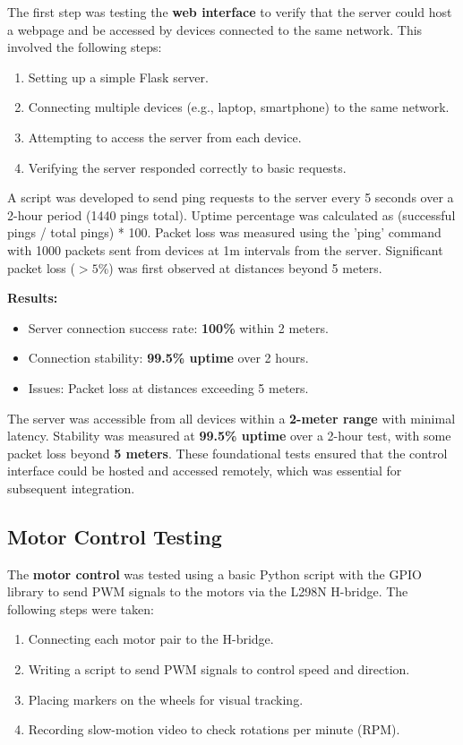 The first step was testing the \textbf{web interface} to verify that the server could host a webpage and be accessed by devices connected to the same network. This involved the following steps:

\begin{enumerate}
	\item Setting up a simple Flask server.
	\item Connecting multiple devices (e.g., laptop, smartphone) to the same network.
	\item Attempting to access the server from each device.
	\item Verifying the server responded correctly to basic requests.
\end{enumerate}

 A script was developed to send ping requests to the server every 5 seconds over a 2-hour period (1440 pings total). Uptime percentage was calculated as (successful pings / total pings) * 100.  Packet loss was measured using the 'ping' command with 1000 packets sent from devices at 1m intervals from the server. Significant packet loss (\(>5\)\%) was first observed at distances beyond 5 meters.
 

\textbf{Results:}
\begin{itemize}
	\item Server connection success rate: \textbf{100\%} within 2 meters.
	\item Connection stability: \textbf{99.5\% uptime} over 2 hours.
	\item Issues: Packet loss at distances exceeding 5 meters.
\end{itemize}

 The server was accessible from all devices within a \textbf{2-meter range} with minimal latency. Stability was measured at \textbf{99.5\% uptime} over a 2-hour test, with some packet loss beyond \textbf{5 meters}. These foundational tests ensured that the control interface could be hosted and accessed remotely, which was essential for subsequent integration.

\subsection{Motor Control Testing}

The \textbf{motor control} was tested using a basic Python script with the GPIO library to send PWM signals to the motors via the L298N H-bridge. The following steps were taken:

\begin{enumerate}
	\item Connecting each motor pair to the H-bridge.
	\item Writing a script to send PWM signals to control speed and direction.
	\item Placing markers on the wheels for visual tracking.
	\item Recording slow-motion video to check rotations per minute (RPM).
\end{enumerate}

